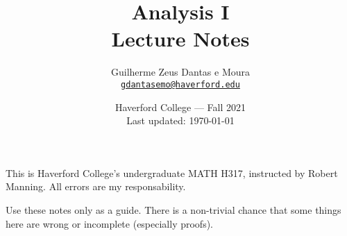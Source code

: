\documentclass{scrbook}
\title{Analysis I\\Lecture Notes}
\author{Guilherme Zeus Dantas e Moura\\\href{mailto:gdantasemo@haverford.edu}{\texttt{gdantasemo@haverford.edu}}}
\date{Haverford College --- Fall 2021\\Last updated: \today}
\begin{document}
	\maketitle

		This is Haverford College's undergraduate MATH H317, instructed by Robert Manning.
		All errors are my responsability.

		Use these notes only as a guide. There is a non-trivial chance that some things here are wrong or incomplete (especially proofs).
	

		\tableofcontents
		\newpage

	
	
	
	
	
	
	
\end{document}
